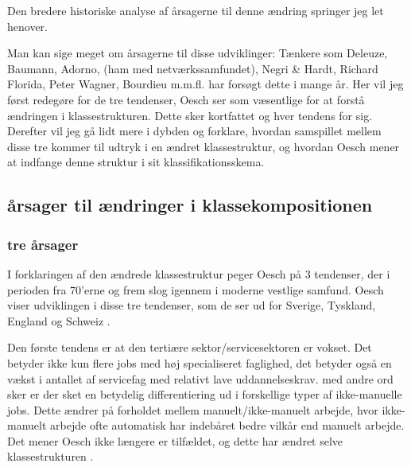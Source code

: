 Den bredere historiske analyse af årsagerne til denne ændring springer jeg let henover.

Man kan sige meget om årsagerne til disse udviklinger: Tænkere som Deleuze, Baumann, Adorno, (ham med netværkssamfundet), Negri \& Hardt, Richard Florida, Peter Wagner, Bourdieu m.m.fl. har forsøgt dette i mange år. Her vil jeg først redegøre for de tre tendenser, Oesch ser som væsentlige for at forstå ændringen i klassestrukturen. Dette sker kortfattet og hver tendens for sig. Derefter vil jeg gå lidt mere i dybden og forklare, hvordan samspillet mellem disse tre kommer til udtryk i en ændret klassestruktur, og hvordan Oesch mener at indfange denne struktur i sit klassifikationsskema. 

%
\subsection{årsager til ændringer i klassekompositionen \label{  subsec teori klasse Oesch aarsager}}
%


%
\subsubsection{tre årsager}
%



I forklaringen af den ændrede klassestruktur peger Oesch på 3 tendenser, der i perioden fra 70'erne og frem slog igennem i moderne vestlige samfund. Oesch viser udviklingen i disse tre tendenser, som de ser ud for Sverige, Tyskland, England og Schweiz \parencite[30]{Oesch2006a}.

Den første tendens er at den tertiære sektor/servicesektoren er vokset. Det betyder ikke kun flere jobs med høj specialiseret faglighed, det betyder også en vækst i antallet af servicefag med relativt lave uddannelseskrav. med andre ord sker er der sket en betydelig differentiering ud i forskellige typer af ikke-manuelle jobs. Dette ændrer på forholdet mellem manuelt/ikke-manuelt arbejde, hvor ikke-manuelt arbejde ofte automatisk har indebåret bedre vilkår end manuelt arbejde. Det mener Oesch ikke længere er tilfældet, og dette har ændret selve klassestrukturen \parencite[47]{Oesch2006a}. 

